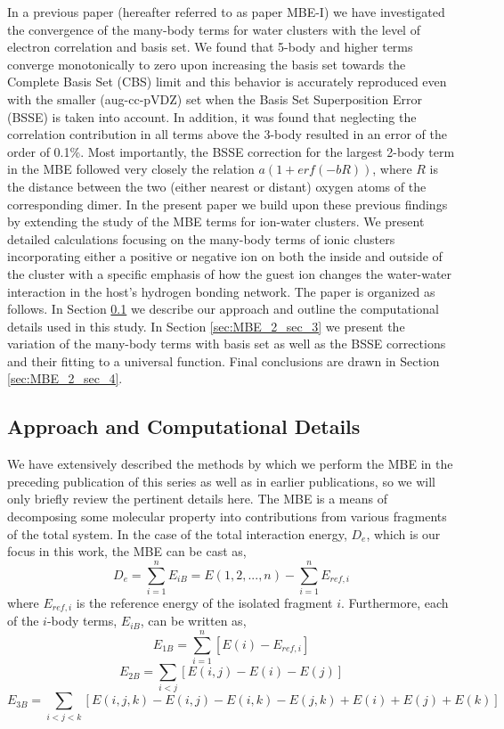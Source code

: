 \documentclass[11pt, proquest]{uwthesis}[2020/02/24]
\begin{document}
\par In a previous paper\autocite{heindel_many-body_2020} (hereafter referred to as paper MBE-I) we have investigated the convergence of the many-body terms for water clusters with the level of electron correlation and basis set. We found that 5-body and higher terms converge monotonically to zero upon increasing the basis set towards the Complete Basis Set (CBS) limit and this behavior is accurately reproduced even with the smaller (aug-cc-pVDZ) set when the Basis Set Superposition Error (BSSE) is taken into account. In addition, it was found that neglecting the correlation contribution in all terms above the 3-body resulted in an error of the order of 0.1\%. Most importantly, the BSSE correction for the largest 2-body term in the MBE followed very closely the relation $a(1+erf(-bR))$, where $R$ is the distance between the two (either nearest or distant) oxygen atoms of the corresponding dimer. In the present paper we build upon these previous findings by extending the study of the MBE terms for ion-water clusters. We present detailed calculations focusing on the many-body terms of ionic clusters incorporating either a positive or negative ion on both the inside and outside of the cluster with a specific emphasis of how the guest ion changes the water-water interaction in the host’s hydrogen bonding network. The paper is organized as follows. In Section \ref{sec:MBE_2_sec_2} we describe our approach and outline the computational details used in this study. In Section \ref{sec:MBE_2_sec_3} we present the variation of the many-body terms with basis set as well as the BSSE corrections and their fitting to a universal function. Final conclusions are drawn in Section \ref{sec:MBE_2_sec_4}.

\subsection{Approach and Computational Details} \label{sec:MBE_2_sec_2}
\par We have extensively described the methods by which we perform the MBE in the preceding publication of this series\autocite{heindel_many-body_2020} as well as in earlier publications,\autocite{xantheas_ab_1994,xantheas_cooperativity_2000} so we will only briefly review the pertinent details here. The MBE is a means of decomposing some molecular property into contributions from various fragments of the total system. In the case of the total interaction energy, $D_e$, which is our focus in this work, the MBE can be cast as,\autocite{xantheas_ab_1994,xantheas_cooperativity_2000,hankins_water_1970}
$$
D_e=\sum_{i=1}^nE_{iB}=E(1,2,...,n)-\sum_{i=1}^nE_{ref,i}
$$
where $E_{ref,i}$ is the reference energy of the isolated fragment $i$. Furthermore, each of the $i$-body terms, $E_{iB}$, can be written as,
$$
E_{1B}=\sum_{i=1}^n[E(i)-E_{ref,i}]
$$
$$
E_{2B}=\sum_{i<j}[E(i,j)-E(i)-E(j)]
$$
$$
E_{3B}=\sum_{i<j<k}[E(i,j,k)-E(i,j)-E(i,k)-E(j,k)+E(i)+E(j)+E(k)]
$$
\end{document}
